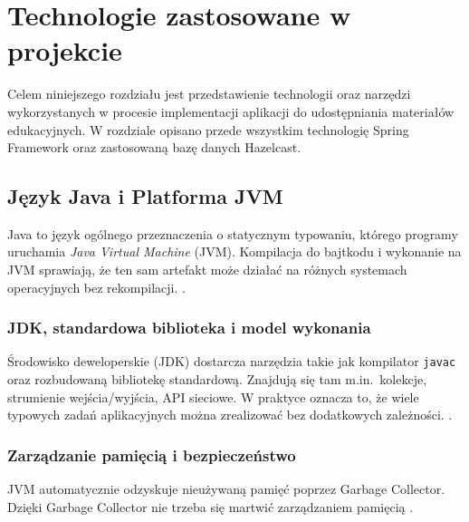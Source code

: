 %


\chapter{Technologie zastosowane w projekcie}
\label{rozdzial1}

Celem niniejszego rozdziału jest przedstawienie technologii oraz narzędzi wykorzystanych w procesie implementacji aplikacji do udostępniania materiałów edukacyjnych. W rozdziale opisano przede wszystkim technologię Spring Framework oraz zastosowaną bazę danych Hazelcast.

\section{Język Java i Platforma JVM}

Java to język ogólnego przeznaczenia o statycznym typowaniu, którego programy uruchamia \emph{Java Virtual Machine} (JVM). Kompilacja do bajtkodu i wykonanie na JVM sprawiają, że ten sam artefakt może działać na różnych systemach operacyjnych bez rekompilacji.  \cite{java-docs}.

\subsection*{JDK, standardowa biblioteka i model wykonania}
Środowisko deweloperskie (JDK) dostarcza narzędzia takie jak kompilator \texttt{javac} oraz rozbudowaną bibliotekę standardową. Znajdują się tam m.in.\ kolekcje, strumienie wejścia/wyjścia, API sieciowe. W praktyce oznacza to, że wiele typowych zadań aplikacyjnych można zrealizować bez dodatkowych zależności. \cite{java-docs,java-head-first}.

\subsection*{Zarządzanie pamięcią i bezpieczeństwo}
JVM automatycznie odzyskuje nieużywaną pamięć poprzez Garbage Collector. Dzięki Garbage Collector nie trzeba się martwić zarządzaniem pamięcią \cite{java-docs}.


